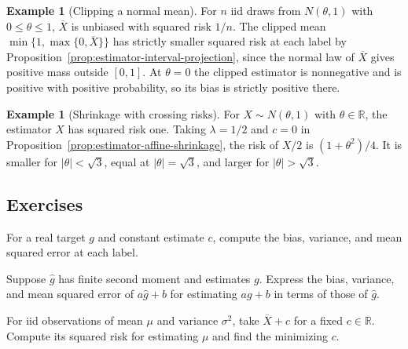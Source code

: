 \documentclass[11pt,oneside]{book}
\theoremstyle{definition}
\newtheorem{example}[theorem]{Example}
\theoremstyle{remark}
\newcommand{\R}{\mathbb R}
\begin{document}
\begin{example}[Clipping a normal mean]
\label{ex:mse-clipped-normal-mean}
For $n$ iid draws from $N(\theta,1)$ with $0\leq\theta\leq1$,
$\overline X$ is unbiased with squared risk $1/n$.
The clipped mean $\min\{1,\max\{0,\overline X\}\}$ has strictly
smaller squared risk at each label by
Proposition~\ref{prop:estimator-interval-projection}, since the
normal law of $\overline X$ gives positive mass outside $[0,1]$.
At $\theta=0$ the clipped estimator is nonnegative and is positive
with positive probability, so its bias is strictly positive there.
\end{example}

\begin{example}[Shrinkage with crossing risks]
\label{ex:mse-normal-shrinkage-crossing}
For $X\sim N(\theta,1)$ with $\theta\in\R$, the estimator $X$
has squared risk one. Taking $\lambda=1/2$ and $c=0$ in
Proposition~\ref{prop:estimator-affine-shrinkage}, the risk of
$X/2$ is $(1+\theta^2)/4$. It is smaller for $|\theta|<\sqrt 3$,
equal at $|\theta|=\sqrt 3$, and larger for $|\theta|>\sqrt 3$.
\end{example}

\subsection{Exercises}
\label{subsec:practice-5-1}

\begin{practiceexercise}
\label{pex:mse-constant-estimate}
For a real target $g$ and constant estimate $c$, compute the bias,
variance, and mean squared error at each label.
\end{practiceexercise}

\begin{practiceexercise}
\label{pex:mse-affine-units}
Suppose $\widehat g$ has finite second moment and estimates $g$.
Express the bias, variance, and mean squared error of
$a\widehat g+b$ for estimating $ag+b$ in terms of those of $\widehat g$.
\end{practiceexercise}

\begin{practiceexercise}
\label{pex:mse-shifted-sample-mean}
For iid observations of mean $\mu$ and variance $\sigma^2$, take
$\overline X+c$ for a fixed $c\in\R$. Compute its squared risk for
estimating $\mu$ and find the minimizing $c$.
\end{practiceexercise}
\end{document}
